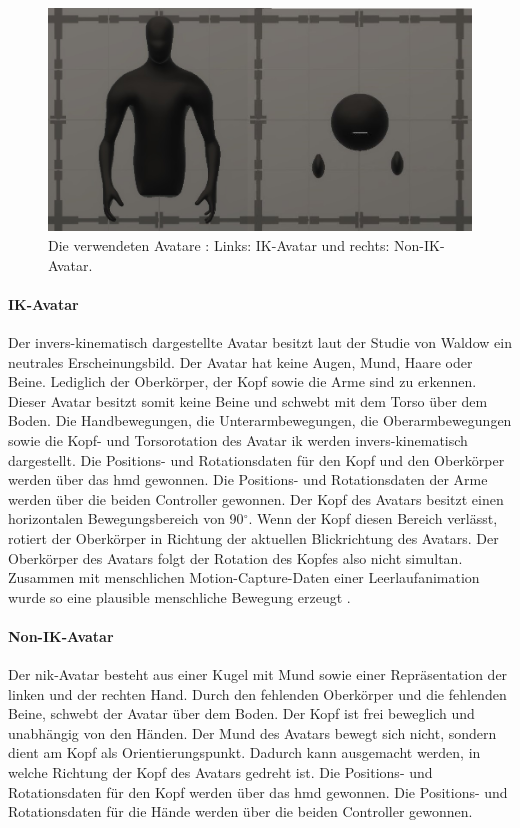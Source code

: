 \documentclass[a4paper,11pt]{article}%
\renewcommand{\\}{\vspace*{0.5\baselineskip} \newline}
\begin{document}
{	\begin{figure}[H]
		\begin{footnotesize}
		\centering
			\includegraphics[width=\textwidth]{Abbildungen/Avatars.JPG}	
			\caption[Die verwendeten Avatare]{Die verwendeten Avatare : Links: IK-Avatar und rechts: Non-IK-Avatar.}
			\label{AvatareAussehen}
		\end{footnotesize}
	\end{figure}
	
		\paragraph{IK-Avatar}
Der invers-kinematisch dargestellte Avatar besitzt laut der Studie von Waldow \citep[S. 251]{waldow2019investigating} ein neutrales Erscheinungsbild. Der Avatar hat keine Augen, Mund, Haare oder Beine. Lediglich der Oberkörper, der Kopf sowie die Arme sind zu erkennen. Dieser Avatar besitzt somit keine Beine und schwebt mit dem Torso über dem Boden.
Die Handbewegungen, die Unterarmbewegungen, die Oberarmbewegungen sowie die Kopf- und Torsorotation des Avatar \ac{ik} werden invers-kinematisch dargestellt. Die Positions- und Rotationsdaten für den Kopf und den Oberkörper werden über das \ac{hmd} gewonnen. Die Positions- und Rotationsdaten der Arme werden über die beiden Controller gewonnen. Der Kopf des Avatars besitzt einen horizontalen Bewegungsbereich von 90$^\circ$. Wenn der Kopf diesen Bereich verlässt, rotiert der Oberkörper in Richtung der aktuellen Blickrichtung des Avatars. Der Oberkörper des Avatars folgt der Rotation des Kopfes also nicht simultan. Zusammen mit menschlichen Motion-Capture-Daten einer Leerlaufanimation wurde so eine plausible menschliche Bewegung erzeugt \citep[S. 251]{waldow2019investigating}.

		\paragraph{Non-IK-Avatar}
Der \ac{nik}-Avatar besteht aus einer Kugel mit Mund sowie einer Repräsentation der linken und der rechten Hand. Durch den fehlenden Oberkörper und die fehlenden Beine, schwebt der Avatar über dem Boden. Der Kopf ist frei beweglich und unabhängig von den Händen. Der Mund des Avatars bewegt sich nicht, sondern dient am Kopf als Orientierungspunkt. Dadurch kann ausgemacht werden, in welche Richtung der Kopf des Avatars gedreht ist. Die Positions- und Rotationsdaten für den Kopf werden über das \ac{hmd} gewonnen. Die Positions- und Rotationsdaten für die Hände werden über die beiden Controller gewonnen.

}
\end{document}
